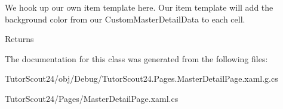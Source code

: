 We hook up our own item template here. Our item template will add the background color from our Custom\+Master\+Detail\+Data to each cell. 

\begin{DoxyReturn}{Returns}

\end{DoxyReturn}


The documentation for this class was generated from the following files\+:\begin{DoxyCompactItemize}
\item 
Tutor\+Scout24/obj/\+Debug/Tutor\+Scout24.\+Pages.\+Master\+Detail\+Page.\+xaml.\+g.\+cs\item 
Tutor\+Scout24/\+Pages/Master\+Detail\+Page.\+xaml.\+cs\end{DoxyCompactItemize}
